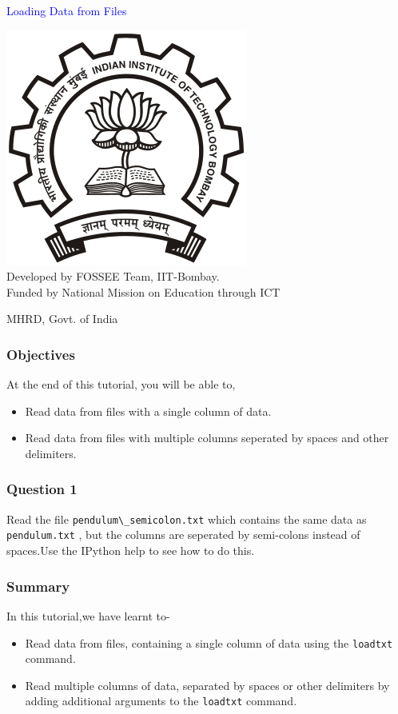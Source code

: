 \documentclass[presentation]{beamer}
\title{}
\author{FOSSEE}
\date{}
\begin{document}
\begin{frame}

\begin{center}
\textcolor{blue}{Loading Data from Files}
\end{center}
\begin{center}
\includegraphics[scale=0.25]{../images/iitb-logo.png}\\
Developed by FOSSEE Team, IIT-Bombay. \\ 
Funded by National Mission on Education through ICT

MHRD, Govt. of India
\end{center}
\end{frame}
\begin{frame}
\frametitle{Objectives}
\label{sec-2}

  At the end of this tutorial, you will be able to,

\begin{itemize}
\item Read data from files with a single column of data.
\item Read data from files with multiple columns seperated by
    spaces and other delimiters.
\end{itemize}
\end{frame}
\begin{frame}
\frametitle{Question 1}
\label{sec-3}

  Read the file  \verb~pendulum\_semicolon.txt~  which contains the same data
  as  \verb~pendulum.txt~ , but the columns are seperated by semi-colons instead
  of spaces.Use the IPython help to see how to do this.
\end{frame}
\begin{frame}
\frametitle{Summary}
\label{sec-4}

  In this tutorial,we have learnt to-

\begin{itemize}
\item Read data from files, containing a single column of data using the
    \verb~loadtxt~ command.
\item Read multiple columns of data, separated by spaces or other
    delimiters by adding additional arguments to the \verb~loadtxt~ command.
\end{itemize}
\end{frame}
\end{document}
